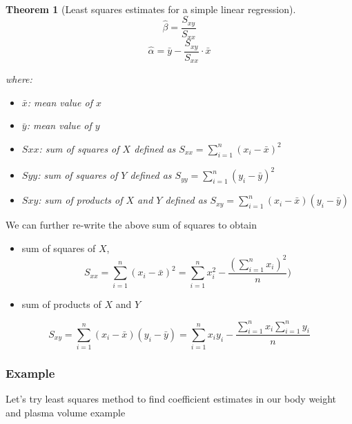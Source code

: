 \documentclass[
]{book}
\providecommand{\tightlist}{%
  \setlength{\itemsep}{0pt}\setlength{\parskip}{0pt}}
\newtheorem{theorem}{Theorem}[chapter]
\theoremstyle{definition}
\theoremstyle{definition}
\theoremstyle{definition}
\theoremstyle{remark}
\begin{document}
~\\
\begin{theorem}[Least squares estimates for a simple linear regression]
\protect\hypertarget{thm:unnamed-chunk-2}{}{\label{thm:unnamed-chunk-2} {} }
\[\hat{\beta} = \frac{S_{xy}}{S_{xx}}\]
\[\hat{\alpha} = \bar{y}-\frac{S_{xy}}{S_{xx}}\cdot \bar{x}\]

where:

\begin{itemize}
\tightlist
\item
  \(\bar{x}\): mean value of \(x\)
\item
  \(\bar{y}\): mean value of \(y\)
\item
  \(S{xx}\): sum of squares of \(X\) defined as \(S_{xx} = \displaystyle \sum_{i=1}^{n}(x_i-\bar{x})^2\)
\item
  \(S{yy}\): sum of squares of \(Y\) defined as \(S_{yy} = \displaystyle \sum_{i=1}^{n}(y_i-\bar{y})^2\)
\item
  \(S{xy}\): sum of products of \(X\) and \(Y\) defined as \(S_{xy} = \displaystyle \sum_{i=1}^{n}(x_i-\bar{x})(y_i-\bar{y})\)
\end{itemize}
\end{theorem}

We can further re-write the above sum of squares to obtain

\begin{itemize}
\tightlist
\item
  sum of squares of \(X\), \[S_{xx} = \displaystyle \sum_{i=1}^{n}(x_i-\bar{x})^2 = \sum_{i=1}^{n}x_i^2-\frac{(\sum_{i=1}^{n}x_i)^2}{n})\]
\item
  sum of products of \(X\) and \(Y\)
\end{itemize}

\[S_{xy} = \displaystyle \sum_{i=1}^{n}(x_i-\bar{x})(y_i-\bar{y})=\sum_{i=1}^nx_iy_i-\frac{\sum_{i=1}^{n}x_i\sum_{i=1}^{n}y_i}{n}\]

\hypertarget{example}{%
\subsubsection{Example}\label{example}}

Let's try least squares method to find coefficient estimates in our body weight and plasma volume example
\end{document}
